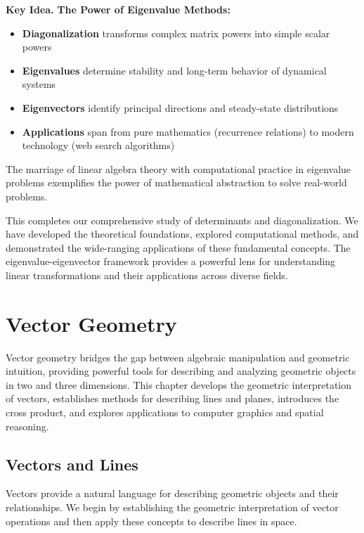 \documentclass[12pt]{article}
\numberwithin{equation}{section}
\theoremstyle{plain}
\theoremstyle{definition}
\theoremstyle{remark}
\newenvironment{keyidea}{\begin{tcolorbox}\textbf{Key Idea.}}{\end{tcolorbox}}
\begin{document}
\begin{keyidea}
\textbf{The Power of Eigenvalue Methods:}
\begin{itemize}
\item \textbf{Diagonalization} transforms complex matrix powers into simple scalar powers
\item \textbf{Eigenvalues} determine stability and long-term behavior of dynamical systems
\item \textbf{Eigenvectors} identify principal directions and steady-state distributions
\item \textbf{Applications} span from pure mathematics (recurrence relations) to modern technology (web search algorithms)
\end{itemize}

The marriage of linear algebra theory with computational practice in eigenvalue problems exemplifies the power of mathematical abstraction to solve real-world problems.
\end{keyidea}

This completes our comprehensive study of determinants and diagonalization. We have developed the theoretical foundations, explored computational methods, and demonstrated the wide-ranging applications of these fundamental concepts. The eigenvalue-eigenvector framework provides a powerful lens for understanding linear transformations and their applications across diverse fields.

\newpage
\section{Vector Geometry}

Vector geometry bridges the gap between algebraic manipulation and geometric intuition, providing powerful tools for describing and analyzing geometric objects in two and three dimensions. This chapter develops the geometric interpretation of vectors, establishes methods for describing lines and planes, introduces the cross product, and explores applications to computer graphics and spatial reasoning.

\subsection{Vectors and Lines}

Vectors provide a natural language for describing geometric objects and their relationships. We begin by establishing the geometric interpretation of vector operations and then apply these concepts to describe lines in space.
\end{document}
